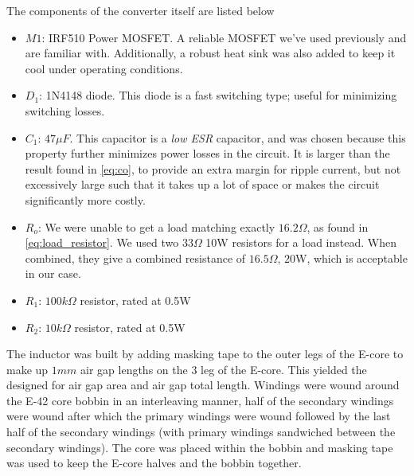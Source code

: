 \documentclass[a4paper, 12pt]{article}
\begin{document}
\noindent
The components of the converter itself are listed below
\begin{itemize}
  \item $M1$: IRF510 Power MOSFET. A reliable MOSFET we've used previously and
    are familiar with. Additionally, a robust heat sink was also added to keep
    it cool under operating conditions.
  \item $D_1$: 1N4148 diode. This diode is a fast switching type; useful for
    minimizing switching losses.
  \item $C_1$: $47 \mu F$. This capacitor is a \textit{low ESR} capacitor, and
    was chosen because this property further minimizes power losses in the
    circuit. It is larger than the result found in \eqref{eq:co}, to provide an
    extra margin for ripple current, but not excessively large such that it
    takes up a lot of space or makes the circuit significantly more costly.
  \item $R_o$: We were unable to get a load matching exactly $16.2\Omega$, as
    found in \ref{eq:load_resistor}. We used two $33\Omega$ 10W resistors for a
    load instead. When combined, they give a combined resistance of
    $16.5\Omega,\, 20$W, which is acceptable in our case.
  \item $R_1$: $100k\Omega$ resistor, rated at 0.5W
  \item $R_2$: $10k\Omega$ resistor, rated at 0.5W
\end{itemize}

\noindent
The inductor was built by adding masking tape to the outer legs of the E-core
to make up $1mm$ air gap lengths on the $3$ leg of the E-core. This yielded the
designed for air gap area and air gap total length. Windings were wound around
the  E-42 core bobbin in an interleaving manner, half of the secondary windings
were wound after which the primary windings were wound followed by the last
half of the secondary windings (with  primary windings sandwiched between the
secondary windings). The core was placed within the bobbin and masking tape was
used to keep the E-core halves and the bobbin together. 
\end{document}
